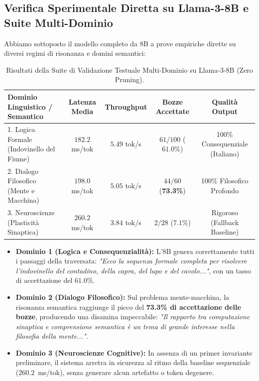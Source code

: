 \documentclass[10pt,a4paper]{article}
\theoremstyle{definition}
\begin{document}
\subsection{Verifica Sperimentale Diretta su Llama-3-8B e Suite Multi-Dominio}
Abbiamo sottoposto il modello completo da 8B a prove empiriche dirette su diversi regimi di risonanza e domini semantici:
\begin{table}[htbp]
\centering
\small
\caption{Risultati della Suite di Validazione Testuale Multi-Dominio su Llama-3-8B (Zero Pruning).}
\label{tab:multidomain_verification}
\begin{tabular}{lcccc}
\toprule
\textbf{Dominio Linguistico / Semantico} & \textbf{Latenza Media} & \textbf{Throughput} & \textbf{Bozze Accettate} & \textbf{Qualità Output} \\
\midrule
1. Logica Formale (Indovinello del Fiume) & $182.2$ ms/tok & $5.49$ tok/s & $61/100$ ($61.0\%$) & 100\% Consequenziale (Italiano) \\
2. Dialogo Filosofico (Mente e Macchina) & $198.0$ ms/tok & $5.05$ tok/s & $44/60$ (\textbf{73.3\%}) & 100\% Filosofico Profondo \\
3. Neuroscienze (Plasticità Sinaptica) & $260.2$ ms/tok & $3.84$ tok/s & $2/28$ ($7.1\%$) & Rigoroso (Fallback Baseline) \\
\bottomrule
\end{tabular}
\end{table}

\begin{itemize}[leftmargin=1.5em]
    \item \textbf{Dominio 1 (Logica e Consequenzialità):} L'8B genera correttamente tutti i passaggi della traversata: \textit{"Ecco la sequenza formale completa per risolvere l'indovinello del contadino, della capra, del lupo e del cavolo..."}, con un tasso di accettazione del $61.0\%$.
    \item \textbf{Dominio 2 (Dialogo Filosofico):} Sul problema mente-macchina, la risonanza semantica raggiunge il picco del \textbf{73.3\% di accettazione delle bozze}, producendo una disamina impeccabile: \textit{"Il rapporto tra computazione sinaptica e comprensione semantica è un tema di grande interesse nella filosofia della mente..."}.
    \item \textbf{Dominio 3 (Neuroscienze Cognitive):} In assenza di un primer invariante preliminare, il sistema arretra in sicurezza al ritmo della baseline sequenziale ($260.2$~ms/tok), senza generare alcun artefatto o token degenere.
\end{itemize}
\end{document}

